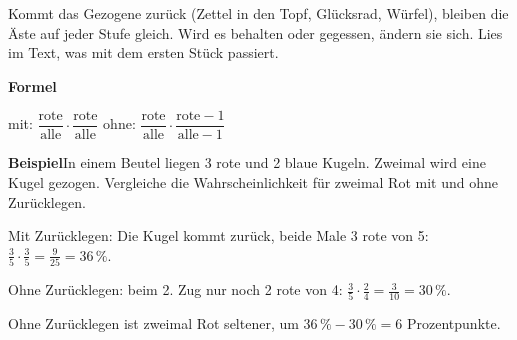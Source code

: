 \documentclass[11pt]{article}
\newlength{\kr}
\begin{document}
\medskip
\par\vspace{3mm}\setlength{\kr}{\dimexpr\pagegoal-\pagetotal-10mm\relax}%
\ifdim\kr>12mm\noindent{\scriptsize\color{mbgrau}Platz zum Rechnen}\par\nointerlineskip\vspace{1mm}\noindent
\begin{tikzpicture}\clip (0,0) rectangle ({\linewidth-0.5mm},\kr);\draw[black!16,line width=0.3pt,step=5mm] (0,0) grid (\linewidth,\kr);\end{tikzpicture}\fi\par
\clearpage\label{s:D}\noindent\colorbox{black!12}{}\hspace{3mm}{\Large\bfseries Mit oder ohne Zurücklegen?}\par\smallskip
\noindent Kommt das Gezogene zurück (Zettel in den Topf, Glücksrad, Würfel), bleiben die Äste auf jeder Stufe gleich. Wird es behalten oder gegessen, ändern sie sich. Lies im Text, was mit dem ersten Stück passiert.\par\medskip
\noindent\textbf{Formel}\par\nopagebreak\noindent\hspace*{4mm}\begin{minipage}{\dimexpr\linewidth-4mm\relax}mit: $\dfrac{\text{rote}}{\text{alle}} \cdot \dfrac{\text{rote}}{\text{alle}}$ \qquad ohne: $\dfrac{\text{rote}}{\text{alle}} \cdot \dfrac{\text{rote} - 1}{\text{alle} - 1}$\end{minipage}\par\medskip
\noindent\textbf{Beispiel}\quad In einem Beutel liegen 3 rote und 2 blaue Kugeln. Zweimal wird eine Kugel gezogen. Vergleiche die Wahrscheinlichkeit für zweimal Rot mit und ohne Zurücklegen.\par\smallskip
\noindent\par\noindent{}Mit Zurücklegen: Die Kugel kommt zurück, beide Male 3 rote von 5: $\frac{3}{5} \cdot \frac{3}{5} = \frac{9}{25} = 36\,\%$.\par\smallskip\par\noindent{}Ohne Zurücklegen: beim 2. Zug nur noch 2 rote von 4: $\frac{3}{5} \cdot \frac{2}{4} = \frac{3}{10} = 30\,\%$.\par\smallskip\par\noindent{}Ohne Zurücklegen ist zweimal Rot seltener, um $36\,\% - 30\,\% = 6$ Prozentpunkte.\par\smallskip\par\medskip
\end{document}
